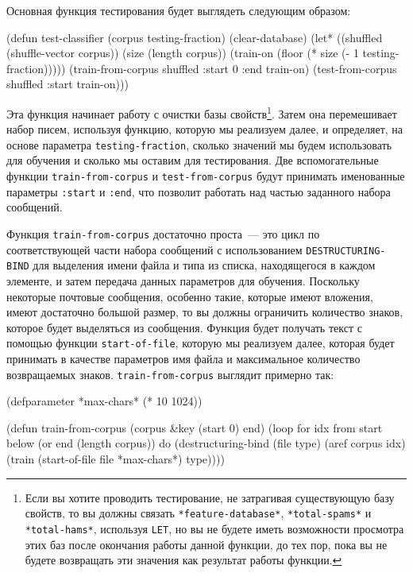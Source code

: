 Основная функция тестирования будет выглядеть следующим образом:

\begin{myverb}
(defun test-classifier (corpus testing-fraction)
  (clear-database)
  (let* ((shuffled (shuffle-vector corpus))
         (size (length corpus))
         (train-on (floor (* size (- 1 testing-fraction)))))
    (train-from-corpus shuffled :start 0 :end train-on)
    (test-from-corpus shuffled :start train-on)))
\end{myverb}

Эта функция начинает работу с очистки базы свойств\footnote{Если вы хотите проводить
  тестирование, не затрагивая существующую базу свойств, то вы должны связать
  \lstinline{*feature-database*}, \lstinline{*total-spams*} и \lstinline{*total-hams*}, используя
  \lstinline{LET}, но вы не будете иметь возможности просмотра этих баз после окончания работы
  данной функции, до тех пор, пока вы не будете возвращать эти значения как результат
  работы функции.}. Затем она перемешивает набор писем, используя функцию, которую мы
реализуем далее, и определяет, на основе параметра \lstinline{testing-fraction}, сколько
значений мы будем использовать для обучения и сколько мы оставим для тестирования.  Две
вспомогательные функции \lstinline{train-from-corpus} и \lstinline{test-from-corpus} будут
принимать именованные параметры \lstinline{:start} и \lstinline{:end}, что позволит работать над
частью заданного набора сообщений.

Функция \lstinline{train-from-corpus} достаточно проста~--- это цикл по соответствующей части
набора сообщений с использованием \lstinline{DESTRUCTURING-BIND} для выделения имени файла и
типа из списка, находящегося в каждом элементе, и затем передача данных параметров для
обучения.  Поскольку некоторые почтовые сообщения, особенно такие, которые имеют вложения,
имеют достаточно большой размер, то вы должны ограничить количество знаков, которое будет
выделяться из сообщения.  Функция будет получать текст с помощью функции
\lstinline{start-of-file}, которую мы реализуем далее, которая будет принимать в качестве
параметров имя файла и максимальное количество возвращаемых знаков.
\lstinline{train-from-corpus} выглядит примерно так:

\begin{myverb}
(defparameter *max-chars* (* 10 1024))

(defun train-from-corpus (corpus &key (start 0) end)
  (loop for idx from start below (or end (length corpus)) do
        (destructuring-bind (file type) (aref corpus idx)
          (train (start-of-file file *max-chars*) type))))
\end{myverb}

